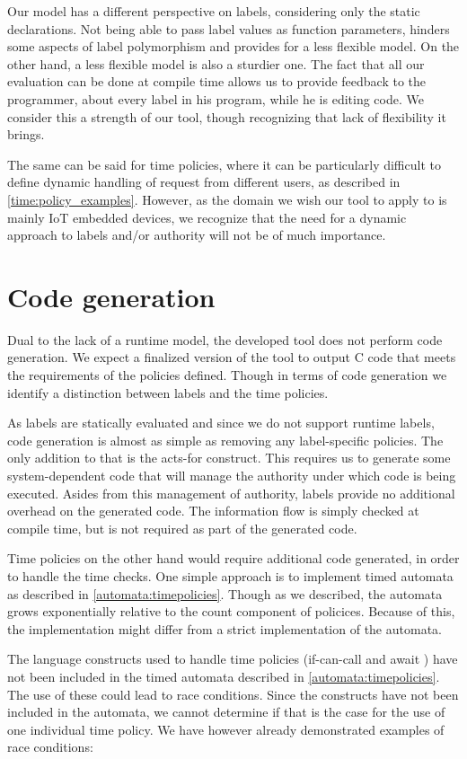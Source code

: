Our model has a different perspective on labels, considering only the static declarations.
Not being able to pass label values as function parameters, hinders some aspects of label polymorphism and provides for a less flexible model.
On the other hand, a less flexible model is also a sturdier one.
The fact that all our evaluation can be done at compile time allows us to provide feedback to the programmer, about every label in his program, while he is editing code.
We consider this a strength of our tool, though recognizing that lack of flexibility it brings.

The same can be said for time policies, where it can be particularly difficult to define dynamic handling of request from different users, as described in \cref{time:policy_examples}.
However, as the domain we wish our tool to apply to is mainly IoT embedded devices, we recognize that the need for a dynamic approach to labels and/or authority will not be of much importance.

\section{Code generation}
Dual to the lack of a runtime model, the developed tool does not perform code generation.
We expect a finalized version of the tool to output C code that meets the requirements of the policies defined.
Though in terms of code generation we identify a distinction between labels and the time policies.

As labels are statically evaluated and since we do not support runtime labels, code generation is almost as simple as removing any label-specific policies.
The only addition to that is the acts-for construct.
This requires us to generate some system-dependent code that will manage the authority under which code is being executed.
Asides from this management of authority, labels provide no additional overhead on the generated code.
The information flow is simply checked at compile time, but is not required as part of the generated code.

Time policies on the other hand would require additional code generated, in order to handle the time checks.
One simple approach is to implement timed automata as described in \cref{automata:timepolicies}.
Though as we described, the automata grows exponentially relative to the count component of policices.
Because of this, the implementation might differ from a strict implementation of the automata.

The language constructs used to handle time policies (if-can-call  and await ) have not been included in the timed automata described in \cref{automata:timepolicies}.
The use of these could lead to race conditions.
Since the constructs have not been included in the automata, we cannot determine if that is the case for the use of one individual time policy.
We have however already demonstrated examples of race conditions: 

